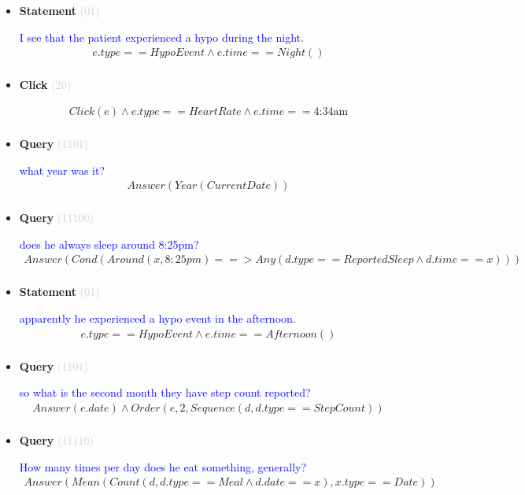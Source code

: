 \documentclass[11pt]{article}
\newcommand{\key}[1]{\textcolor{lightgray}{#1}}
\newcounter{CQuery}
\newcounter{CStatement}
\newcounter{CClick}
\begin{document}
\begin{itemize}
\item
\textbf{Statement\theCStatement} \key{(01)} \addtocounter{CStatement}{1}
\textcolor{blue}{ I see that the patient experienced a hypo during the night. }
\begin{multline*}
e.type==HypoEvent \wedge e.time==Night() \\ 
\end{multline*}


\item
\textbf{Click\theCClick} \key{(20)} \addtocounter{CClick}{1}
\textcolor{blue}{  }
\begin{multline*}
Click(e) \wedge e.type==HeartRate \wedge e.time==\mbox{4:34am} \\ 
\end{multline*}


\item
\textbf{Query\theCQuery} \key{(1101)} \addtocounter{CQuery}{1}
\textcolor{blue}{ what year was it? }
\begin{multline*}
Answer(Year(CurrentDate)) \\ 
\end{multline*}


\item
\textbf{Query\theCQuery} \key{(11100)} \addtocounter{CQuery}{1}
\textcolor{blue}{ does he always sleep around 8:25pm? }
\begin{multline*}
Answer(Cond(Around(x, 8:25pm) ==> Any(d.type==ReportedSleep \wedge d.time==x))) \\ 
\end{multline*}


\item
\textbf{Statement\theCStatement} \key{(01)} \addtocounter{CStatement}{1}
\textcolor{blue}{ apparently he experienced a hypo event in the afternoon. }
\begin{multline*}
e.type==HypoEvent \wedge e.time==Afternoon() \\ 
\end{multline*}


\item
\textbf{Query\theCQuery} \key{(1101)} \addtocounter{CQuery}{1}
\textcolor{blue}{ so what is the second month they have step count reported? }
\begin{multline*}
Answer(e.date) \wedge Order(e, 2, Sequence(d, d.type==StepCount)) \\ 
\end{multline*}


\item
\textbf{Query\theCQuery} \key{(11110)} \addtocounter{CQuery}{1}
\textcolor{blue}{ How many times per day does he eat something, generally? }
\begin{multline*}
Answer(Mean(Count(d, d.type==Meal \wedge d.date==x), x.type==Date)) \\ 
\end{multline*}



\end{itemize}
\end{document}
